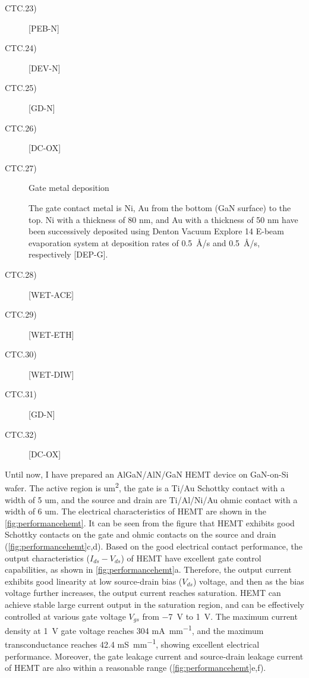 \begin{description}
	\item[CTC.23)] [PEB-N]
	
	\item[CTC.24)] [DEV-N]
	
	\item[CTC.25)] [GD-N]
	
	\item[CTC.26)] [DC-OX]
	
	\item[CTC.27)] Gate metal deposition

	The  gate  contact metal is Ni, Au from the bottom (GaN surface) to the top. Ni with a thickness of 80 \unit{\nm}, and Au with a thickness of 50 \unit{\nm} have been successively deposited using Denton Vacuum Explore 14 E-beam evaporation system at deposition rates of \SI{0.5}{\angstrom}/s and \SI{0.5}{\angstrom}/s, respectively [DEP-G].
		
	\item[CTC.28)] [WET-ACE]
	
	\item[CTC.29)] [WET-ETH]
	
	\item[CTC.30)] [WET-DIW]
	
	\item[CTC.31)] [GD-N]
	
	\item[CTC.32)] [DC-OX]
	
\end{description}

Until  now, I have prepared an AlGaN/AlN/GaN  HEMT device on  GaN-on-Si wafer. The active region  is  \unit{um^2}, the gate is a Ti/Au Schottky contact with a width of 5 \unit{um}, and the source and drain are Ti/Al/Ni/Au ohmic  contact with a width of 6 \unit{um}. The electrical characteristics of HEMT are shown in the \autoref{fig:performancehemt}. It can be seen from the figure that HEMT exhibits good Schottky contacts  on the gate and ohmic contacts on the source and drain (\autoref{fig:performancehemt}c,d). Based on the good electrical contact performance, the output characteristics ($I_{ds}-V_{ds}$) of HEMT have excellent gate control capabilities, as shown in \autoref{fig:performancehemt}a. Therefore, the output current  exhibits good linearity at low source-drain bias ($V_{ds}$) voltage, and then as the bias voltage further increases, the output current reaches saturation. HEMT can achieve stable large current output in the saturation region, and can be effectively controlled at various  gate voltage $V_{gs}$ from \SI{-7}{\volt} to \SI{1}{\volt}. The maximum current density at \SI{1}{\volt} gate voltage reaches 304 \unit{\mA\per\mm}, and the maximum transconductance  reaches 42.4 \unit{\milli\siemens\per\mm}, showing excellent electrical performance. Moreover, the gate leakage current  and source-drain leakage current of HEMT are also within a  reasonable range (\autoref{fig:performancehemt}e,f).

